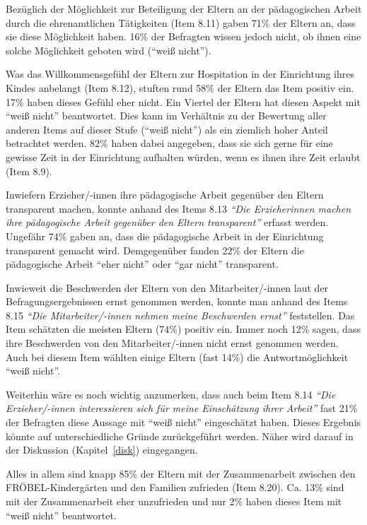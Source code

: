 \documentclass[12pt,a4paper]{article}
\begin{document}
	Bezüglich der Möglichkeit zur Beteiligung der Eltern an der pädagogischen Arbeit durch die ehrenamtlichen Tätigkeiten (Item 8.11) gaben 71\% der Eltern an, dass sie diese Möglichkeit haben. 16\% der Befragten wissen jedoch nicht, ob ihnen eine solche Möglichkeit geboten wird ("`weiß nicht"'). 
		
	Was das Willkommensgefühl der Eltern zur Hospitation in der Einrichtung ihres Kindes anbelangt (Item 8.12), stuften rund 58\% der Eltern das Item positiv ein. 17\% haben dieses Gefühl eher nicht. Ein Viertel der Eltern hat diesen Aspekt mit "`weiß nicht"' beantwortet. Dies kann im Verhältnis zu der Bewertung aller anderen Items auf dieser Stufe ("`weiß nicht"') als ein ziemlich hoher Anteil betrachtet werden. 82\% haben dabei angegeben, dass sie sich gerne für eine gewisse Zeit in der Einrichtung aufhalten würden, wenn es ihnen ihre Zeit erlaubt (Item 8.9).
	
	Inwiefern Erzieher/-innen ihre pädagogische Arbeit gegenüber den Eltern transparent machen, konnte anhand des Items 8.13 \textit{"`Die Erzieherinnen machen ihre pädagogische Arbeit gegenüber den Eltern transparent"'} erfasst werden. Ungefähr 74\% gaben an, dass die pädagogische Arbeit in der Einrichtung transparent gemacht wird. Demgegenüber fanden 22\% der Eltern die pädagogische Arbeit "`eher nicht"' oder "`gar nicht"' transparent.
	
	Inwieweit die Beschwerden der Eltern von den Mitarbeiter/-innen laut der Befragungsergebnissen ernst genommen werden, konnte man anhand des Items 8.15 \textit{"`Die Mitarbeiter/-innen nehmen meine Beschwerden ernst"'} feststellen. Das Item schätzten die meisten Eltern (74\%) positiv ein. Immer noch 12\% sagen, dass ihre Beschwerden von den Mitarbeiter/-innen nicht ernst genommen werden. Auch bei diesem Item wählten einige Eltern (fast 14\%) die Antwortmöglichkeit "`weiß nicht"'.
	
	Weiterhin wäre es noch wichtig anzumerken, dass auch beim Item 8.14 \textit{"`Die Erzieher/-innen interessieren sich für meine Einschätzung ihrer Arbeit"'} fast 21\% der Befragten diese Aussage mit "`weiß nicht"' eingeschätzt haben. Dieses Ergebnis könnte auf unterschiedliche Gründe zurückgeführt werden. Näher wird darauf in der Diskussion (Kapitel~\ref{disk}) eingegangen.
	
 	Alles in allem sind knapp 85\% der Eltern mit der Zusammenarbeit zwischen den FRÖBEL-Kindergärten und den Familien zufrieden (Item 8.20). Ca. 13\% sind mit der Zusammenarbeit eher unzufrieden und nur 2\% haben dieses Item mit "`weiß nicht"' beantwortet.
 	
\end{document}
